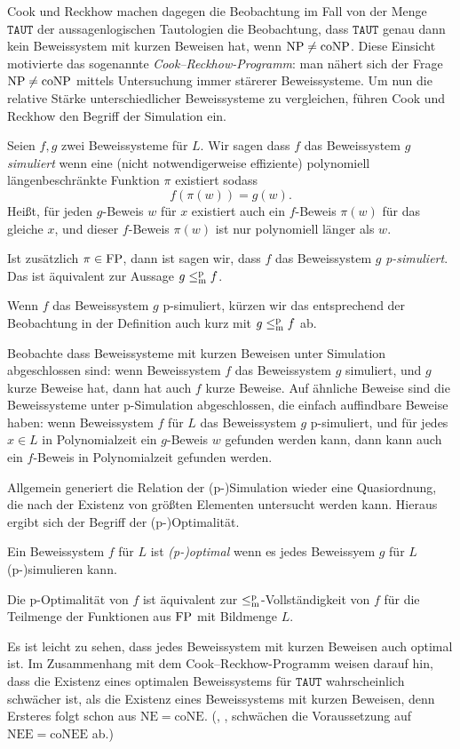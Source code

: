 Cook und Reckhow machen dagegen die Beobachtung im Fall von der Menge $\mathtt{TAUT}$ der aussagenlogischen Tautologien die Beobachtung, dass $\mathtt{TAUT}$ genau dann kein Beweissystem mit kurzen Beweisen hat, wenn $\mathrm{NP}\neq\mathrm{coNP}$.
Diese Einsicht motivierte das sogenannte \emph{Cook–Reckhow-Programm}: man nähert sich der Frage  $\mathrm{NP}\neq \mathrm{coNP}$ mittels Untersuchung immer stärerer Beweissysteme.
Um nun die relative Stärke unterschiedlicher Beweissysteme zu vergleichen, führen Cook und Reckhow den Begriff der Simulation ein.
\begin{definition}
    Seien $f,g$ zwei Beweissysteme für $L$. Wir sagen dass $f$ das Beweissystem $g$ \emph{simuliert} wenn eine (nicht notwendigerweise effiziente) polynomiell längenbeschränkte Funktion $\pi$  existiert sodass 
    \[ f(\pi(w))=g(w). \]
    Heißt, für jeden $g$-Beweis $w$ für $x$ existiert auch ein $f$-Beweis $\pi(w)$ für das gleiche $x$, und dieser $f$-Beweis $\pi(w)$ ist nur polynomiell länger als $w$.

    Ist zusätzlich $\pi\in\mathrm{FP}$, dann ist sagen wir, dass $f$ das Beweissystem $g$ \emph{p-simuliert}. Das ist äquivalent zur Aussage $g \leq_\mathrm{m}^\mathrm{p} f$.
\end{definition}
Wenn $f$ das Beweissystem $g$ p-simuliert, kürzen wir das entsprechend der Beobachtung in der Definition auch kurz mit $g\leq_\mathrm{m}^\mathrm{p} f$ ab.

Beobachte dass Beweissysteme mit kurzen Beweisen unter Simulation abgeschlossen sind: wenn Beweissystem $f$ das Beweissystem $g$ simuliert, und $g$ kurze Beweise hat, dann hat auch $f$ kurze Beweise. 
Auf ähnliche Beweise sind die Beweissysteme unter p-Simulation abgeschlossen, die einfach auffindbare Beweise haben:  wenn Beweissystem $f$ für $L$ das Beweissystem $g$ p-simuliert, und für jedes $x\in L$ in Polynomialzeit ein $g$-Beweis $w$ gefunden werden kann, dann kann auch ein $f$-Beweis in Polynomialzeit gefunden werden.

Allgemein generiert die Relation der (p-)Simulation wieder eine Quasiordnung, die nach der Existenz von größten  Elementen untersucht werden kann. 
Hieraus ergibt sich der Begriff der (p-)Optimalität.
\begin{definition}
    Ein Beweissystem $f$ für $L$ ist \emph{(p-)optimal} wenn es jedes Beweissyem $g$ für $L$ (p-)simulieren kann.

    Die p-Optimalität von $f$ ist äquivalent zur $\leq_\mathrm{m}^\mathrm{p}$-Vollständigkeit von $f$ für die Teilmenge der Funktionen aus $\mathrm{FP}$ mit Bildmenge $L$.
\end{definition}
Es ist leicht zu sehen, dass jedes Beweissystem mit kurzen Beweisen auch optimal ist. Im Zusammenhang mit dem Cook–Reckhow-Programm weisen \textcite{krajicek_propositional_1989} darauf hin, dass die Existenz eines optimalen Beweissystems für $\mathtt{TAUT}$ wahrscheinlich schwächer ist, als die Existenz eines Beweissystems mit kurzen Beweisen, denn Ersteres folgt schon aus $\mathrm{NE}=\mathrm{coNE}$. (\citeauthor{kobler_optimal_2003}, \citeyear{kobler_optimal_2003}, schwächen die Voraussetzung auf $\mathrm{NEE=coNEE}$ ab.)

